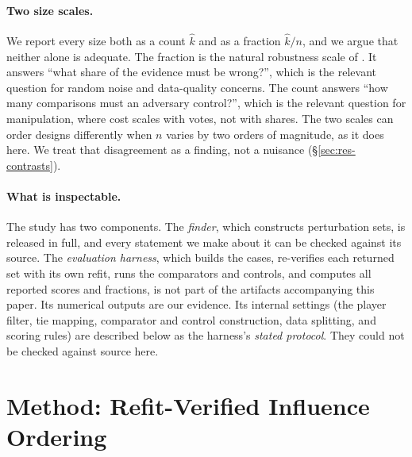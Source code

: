 \documentclass{article}
\newcommand{\kver}{\hat{k}}
\begin{document}
\paragraph{Two size scales.}
We report every size both as a count $\kver$ and as a fraction $\kver/n$, and we argue that neither alone is adequate. The fraction is the natural robustness scale of \citet{Broderick2020AnAF}. It answers ``what share of the evidence must be wrong?'', which is the relevant question for random noise and data-quality concerns. The count answers ``how many comparisons must an adversary control?'', which is the relevant question for manipulation, where cost scales with votes, not with shares. The two scales can order designs differently when $n$ varies by two orders of magnitude, as it does here. We treat that disagreement as a finding, not a nuisance (\S\ref{sec:res-contrasts}).

\paragraph{What is inspectable.}
The study has two components. The \emph{finder}, which constructs perturbation sets, is released in full, and every statement we make about it can be checked against its source. The \emph{evaluation harness}, which builds the cases, re-verifies each returned set with its own refit, runs the comparators and controls, and computes all reported scores and fractions, is not part of the artifacts accompanying this paper. Its numerical outputs are our evidence. Its internal settings (the player filter, tie mapping, comparator and control construction, data splitting, and scoring rules) are described below as the harness's \emph{stated protocol}. They could not be checked against source here.

\section{Method: Refit-Verified Influence Ordering}
\label{sec:method}
\end{document}
